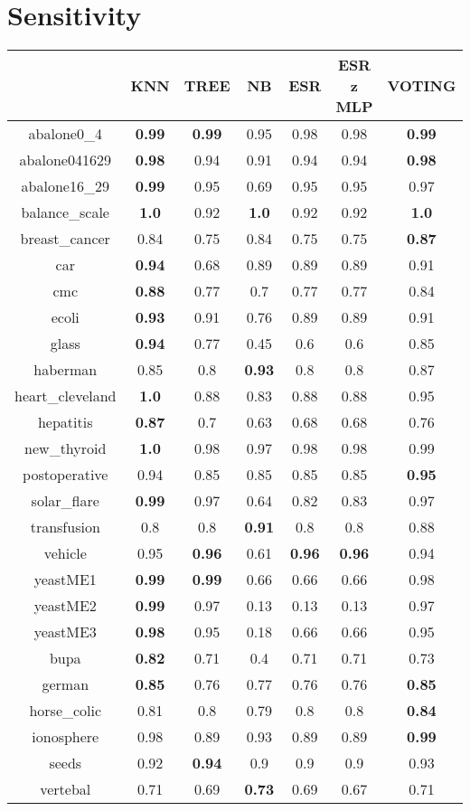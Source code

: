 \documentclass{article}%
\begin{document}
%
\section*{Sensitivity}%
\begin{tabular}{c|cccccc}%
\hline%
&KNN&TREE&NB&ESR&ESR z MLP&VOTING\\%
\hline%
abalone0\_4&\textbf{0.99}&\textbf{0.99}&0.95&0.98&0.98&\textbf{0.99}\\%
\hline%
abalone041629&\textbf{0.98}&0.94&0.91&0.94&0.94&\textbf{0.98}\\%
\hline%
abalone16\_29&\textbf{0.99}&0.95&0.69&0.95&0.95&0.97\\%
\hline%
balance\_scale&\textbf{1.0}&0.92&\textbf{1.0}&0.92&0.92&\textbf{1.0}\\%
\hline%
breast\_cancer&0.84&0.75&0.84&0.75&0.75&\textbf{0.87}\\%
\hline%
car&\textbf{0.94}&0.68&0.89&0.89&0.89&0.91\\%
\hline%
cmc&\textbf{0.88}&0.77&0.7&0.77&0.77&0.84\\%
\hline%
ecoli&\textbf{0.93}&0.91&0.76&0.89&0.89&0.91\\%
\hline%
glass&\textbf{0.94}&0.77&0.45&0.6&0.6&0.85\\%
\hline%
haberman&0.85&0.8&\textbf{0.93}&0.8&0.8&0.87\\%
\hline%
heart\_cleveland&\textbf{1.0}&0.88&0.83&0.88&0.88&0.95\\%
\hline%
hepatitis&\textbf{0.87}&0.7&0.63&0.68&0.68&0.76\\%
\hline%
new\_thyroid&\textbf{1.0}&0.98&0.97&0.98&0.98&0.99\\%
\hline%
postoperative&0.94&0.85&0.85&0.85&0.85&\textbf{0.95}\\%
\hline%
solar\_flare&\textbf{0.99}&0.97&0.64&0.82&0.83&0.97\\%
\hline%
transfusion&0.8&0.8&\textbf{0.91}&0.8&0.8&0.88\\%
\hline%
vehicle&0.95&\textbf{0.96}&0.61&\textbf{0.96}&\textbf{0.96}&0.94\\%
\hline%
yeastME1&\textbf{0.99}&\textbf{0.99}&0.66&0.66&0.66&0.98\\%
\hline%
yeastME2&\textbf{0.99}&0.97&0.13&0.13&0.13&0.97\\%
\hline%
yeastME3&\textbf{0.98}&0.95&0.18&0.66&0.66&0.95\\%
\hline%
bupa&\textbf{0.82}&0.71&0.4&0.71&0.71&0.73\\%
\hline%
german&\textbf{0.85}&0.76&0.77&0.76&0.76&\textbf{0.85}\\%
\hline%
horse\_colic&0.81&0.8&0.79&0.8&0.8&\textbf{0.84}\\%
\hline%
ionosphere&0.98&0.89&0.93&0.89&0.89&\textbf{0.99}\\%
\hline%
seeds&0.92&\textbf{0.94}&0.9&0.9&0.9&0.93\\%
\hline%
vertebal&0.71&0.69&\textbf{0.73}&0.69&0.67&0.71\\%
\hline%
\end{tabular}
\end{document}
